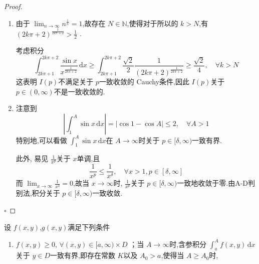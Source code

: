 \documentclass[lang=cn,12pt,color=green,fontset=none,thmcnt=section]{elegantbook}
\begin{document}
\begin{proof}
    \begin{enumerate}
       
        \item  由于 $ \lim_{n \to \infty} n^{\frac{1}{n}} =1$,故存在 $  N \in \mathbb{N}  $,使得对于所以的 $ k >N $,有 $ \left( 2k\pi + 2 \right)^{\frac{1}{2k\pi + 2}}  > \frac{1}{2}$ .
        
        考虑积分 $$
        \int_{2k\pi + 1}^{2k\pi + 2 }\frac{\sin x }{x^{\frac{1}{2k\pi + 2}} }\,\mathrm{d} x\ge \int_{2k\pi + 1}^{2k\pi + 2} \frac{\sqrt{2} }{2 } \frac{1 }{\left( 2k\pi + 2 \right)  ^{\frac{1}{2k\pi+ 2 }}}   \ge  \frac{\sqrt{2} }{4 } ,\quad  \forall k >N
        $$这表明 $ I\left( p \right)  $不满足关于 $ p $一致收敛的 Cauchy条件,因此 $ I\left( p \right)  $关于 $ p \in \left( 0,\infty \right)  $不是一致收敛的.
        
        \item 注意到 $$
        \left| \int_{1}^{A} \sin x\,\mathrm{d} x \right| = \left| \cos 1-\cos A \right| \le 2,\quad \forall A >1
        $$特别地,可以看做 $ \int_{1}^{A} \sin x\,\mathrm{d} x $在 $ A\to \infty $时关于 $ p \in [ \delta ,\infty) $一致有界.   

        此外, 易见 $ \frac{1}{x^{p}} $关于 $ x $单调,且 $$
        \frac{1}{x^{p}}\le  \frac{1}{x^ \delta } ,\quad \forall x >1,p \in [ \delta ,\infty]
        $$  而 $ \lim_{x \to \infty} \frac{1}{x^{ \delta }}=0 $,故当 $ x\to \infty $时, $ \frac{1}{x^{p}} $关于 $ p \in [ \delta ,\infty) $一致地收敛于零.由A-D判别法,积分关于 $ p \in [ \delta ,\infty) $一致收敛. 
    \end{enumerate}
    

    \hfill $\square$
\end{proof}
\begin{exercise}
    设 $ f\left( x,y \right)  $,$ g\left( x,y \right)  $满足下列条件
    \begin{enumerate}
        \item $ f\left( x,y \right)\ge 0  $, $ \forall \left( x,y \right) \in [a,\infty)\times D  $  ；当 $ A\to \infty $时,含参积分 $ \int_{a}^{A}f\left( x,y \right)\,\mathrm{d} x  $  关于 $ y \in D $一致有界,即存在常数 $ K $以及 $ A_0>a $,使得当 $ A\ge A_0 $时,    
    \end{enumerate}
      
\end{exercise}
\end{document}
